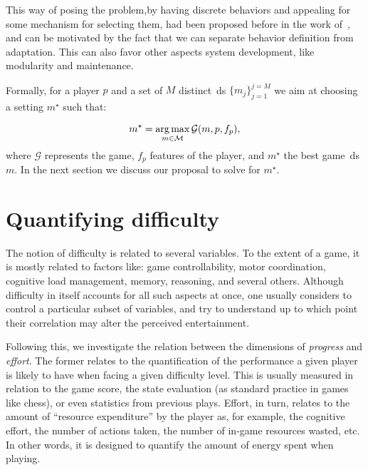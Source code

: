 This way of posing the problem,\ie by having discrete behaviors and appealing for some mechanism for selecting them, had been proposed before in the work of~\cite{sejrsgaard-jacobsen_dynamic_2011}, and can be motivated by the fact that we can separate behavior definition from adaptation. This can also favor other aspects system development, like modularity and maintenance.

Formally, for a player $p$ and a set of $M$ distinct~\gls{ds} $\{m_{j}\}^{j=M}_{j=1}$ we aim at choosing a setting $m^{\star}$ such that:

\begin{equation}
m^{\star} = \operatorname*{arg\,max}_{m \in \mathcal{M}} \mathcal{G}(m, p, f_{p}),
\end{equation}
where $\mathcal{G}$ represents the game, $f_{p}$ features of the player, and $m^{\star}$ the best game~\gls{ds} $m$. 
In the next section we discuss our proposal to solve for $m^{\star}$.

\section{Quantifying difficulty}\label{sec:quant_difficulty}
The notion of difficulty is related to several variables. To the extent of a game, it is mostly related to factors like: game controllability, motor coordination, cognitive load management, memory, reasoning, and several others. Although difficulty in itself accounts for all such aspects at once, one usually considers to control a particular subset of variables, and try to understand up to which point their correlation may alter the perceived entertainment.

Following this, we investigate the relation between the dimensions of \textit{progress} and \textit{effort}. The former relates to the quantification of the performance a given player is likely to have when facing a given difficulty level. %
This is usually measured in relation to the game score, the state evaluation (as standard practice in games like chess), or even statistics from previous plays. Effort, in turn, relates to the amount of ``resource expenditure'' by the player as, for example, the cognitive effort, the number of actions taken, the number of in-game resources wasted, etc. In other words, it is designed to quantify the amount of energy spent when playing.

